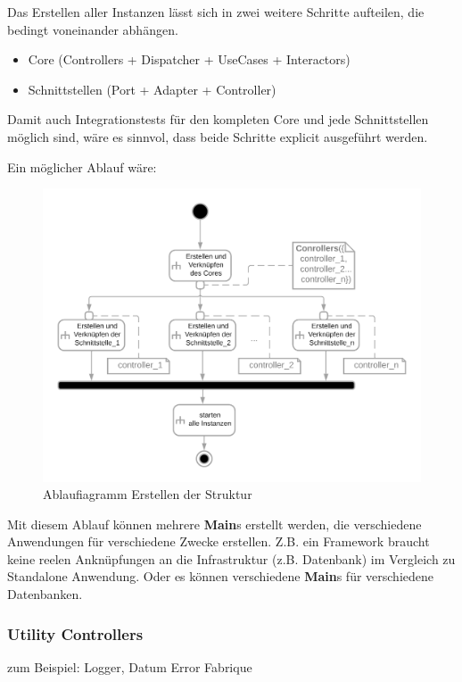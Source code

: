 \documentclass{article}
\begin{document}
    Das Erstellen aller Instanzen lässt sich in zwei weitere Schritte aufteilen, die bedingt voneinander abhängen.
    \begin{itemize}
        \item Core (Controllers + Dispatcher + UseCases + Interactors)
        \item Schnittstellen (Port + Adapter + Controller)
    \end{itemize}

    Damit auch Integrationstests für den kompleten Core und jede Schnittstellen möglich sind, wäre es sinnvol, dass beide Schritte
    explicit ausgeführt werden.

    Ein möglicher Ablauf wäre:
    \begin{figure}[H]
        \centering
        \includegraphics[width=12cm]{./images/Erstellen AD.png}
         \caption[Ablaufiagramm Erstellen der Struktur]{Ablaufiagramm Erstellen der Struktur \footnotemark}
         \label{fig:ADCreate}
    \end{figure}


    Mit diesem Ablauf können mehrere \textbf{Main}s erstellt werden, die verschiedene Anwendungen für verschiedene Zwecke erstellen.
    Z.B. ein Framework braucht keine reelen Anknüpfungen an die Infrastruktur (z.B. Datenbank) im Vergleich zu Standalone Anwendung.
    Oder es können verschiedene \textbf{Main}s für verschiedene Datenbanken.


    \subsubsection{Utility Controllers}
    zum Beispiel: Logger, Datum Error Fabrique
\end{document}
